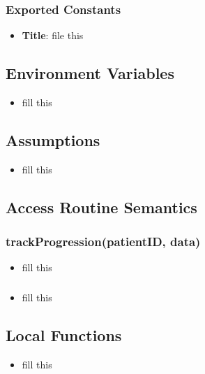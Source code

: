 \documentclass[12pt, titlepage]{article}
\begin{document}
\subsubsection{Exported Constants}
\begin{itemize}
\item \textbf{Title}: file this 
\end{itemize}

\subsection{Environment Variables}
\begin{itemize}
    \item fill this
\end{itemize}

\subsection{Assumptions}
\begin{itemize}
    \item fill this
\end{itemize}

\subsection{Access Routine Semantics}
\subsubsection{trackProgression(patientID, data)}

\begin{itemize}
    \item fill this
\end{itemize}

\subsubsection{}

\begin{itemize}
    \item fill this
\end{itemize}


\subsection{Local Functions}
\begin{itemize}
    \item fill this
\end{itemize}
\end{document}
